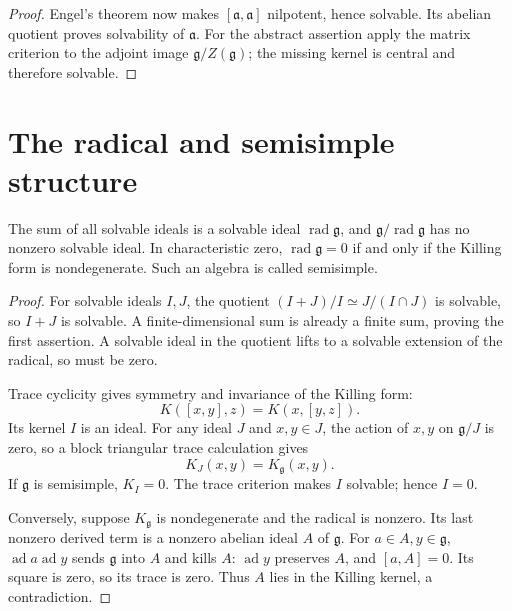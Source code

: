 \begin{proof}
Engel's theorem now makes \([\mathfrak a,\mathfrak a]\)
nilpotent, hence solvable. Its abelian quotient proves
solvability of \(\mathfrak a\).
For the abstract assertion apply the matrix criterion
to the adjoint image \(\mathfrak g/Z(\mathfrak g)\);
the missing kernel is central and therefore solvable.
\end{proof}

\section{The radical and semisimple structure}

\begin{theorem}\label{res:B05}
The sum of all solvable ideals is a solvable ideal
\(\operatorname{rad}\mathfrak g\), and
\(\mathfrak g/\operatorname{rad}\mathfrak g\) has no nonzero
solvable ideal. In characteristic zero,
\(\operatorname{rad}\mathfrak g=0\) if and only if the Killing
form is nondegenerate. Such an algebra is called semisimple.
\end{theorem}

\begin{proof}
For solvable ideals \(I,J\), the quotient
\((I+J)/I\simeq J/(I\cap J)\) is solvable, so \(I+J\)
is solvable. A finite-dimensional sum is already a finite
sum, proving the first assertion. A solvable ideal in the
quotient lifts to a solvable extension of the radical,
so must be zero.

Trace cyclicity gives symmetry and invariance of the Killing
form:
\[
 K([x,y],z)=K(x,[y,z]).
 \tag{2.3}\label{eq:killing-invariant}
\]
Its kernel \(I\) is an ideal. For any ideal \(J\) and
\(x,y\in J\), the action of \(x,y\) on \(\mathfrak g/J\)
is zero, so a block triangular trace calculation gives
\[
 K_J(x,y)=K_{\mathfrak g}(x,y).
 \tag{2.4}\label{eq:killing-ideal}
\]
If \(\mathfrak g\) is semisimple, \(K_I=0\).
The trace criterion makes \(I\) solvable; hence \(I=0\).

Conversely, suppose \(K_{\mathfrak g}\) is nondegenerate
and the radical is nonzero. Its last nonzero derived term
is a nonzero abelian ideal \(A\) of \(\mathfrak g\).
For \(a\in A,y\in\mathfrak g\),
\(\operatorname{ad}a\operatorname{ad}y\) sends
\(\mathfrak g\) into \(A\) and kills \(A\):
\(\operatorname{ad}y\) preserves \(A\), and
\([a,A]=0\). Its square is zero, so its trace is zero.
Thus \(A\) lies in the Killing kernel, a contradiction.
\end{proof}


